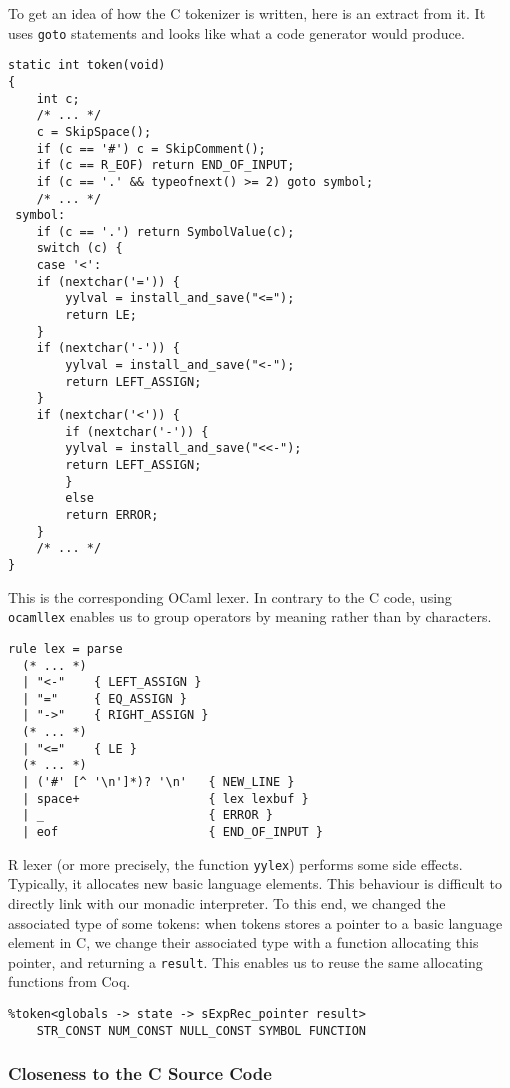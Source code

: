 \documentclass{article}
\newcommand\Coq{Coq}
\newcommand\OCaml{OCaml}
\newcommand\R{R}
\newcommand\Cn{C}
\begin{document}
To get an idea of how the \Cn{} tokenizer is written, here is an extract from it.
It uses \texttt{goto} statements and looks like
what a code generator would produce.
\begin{verbatim}
static int token(void)
{
    int c;
    /* ... */
    c = SkipSpace();
    if (c == '#') c = SkipComment();
    if (c == R_EOF) return END_OF_INPUT;
    if (c == '.' && typeofnext() >= 2) goto symbol;
    /* ... */
 symbol:
    if (c == '.') return SymbolValue(c);
    switch (c) {
    case '<':
    if (nextchar('=')) {
        yylval = install_and_save("<=");
        return LE;
    }
    if (nextchar('-')) {
        yylval = install_and_save("<-");
        return LEFT_ASSIGN;
    }
    if (nextchar('<')) {
        if (nextchar('-')) {
        yylval = install_and_save("<<-");
        return LEFT_ASSIGN;
        }
        else
        return ERROR;
    }
    /* ... */
}
\end{verbatim}
This is the corresponding \OCaml{} lexer.
In contrary to the \Cn{} code,
using \texttt{ocamllex} enables us to group operators
by meaning rather than by characters.
\begin{verbatim}
rule lex = parse
  (* ... *)
  | "<-"    { LEFT_ASSIGN }
  | "="     { EQ_ASSIGN }
  | "->"    { RIGHT_ASSIGN }
  (* ... *)
  | "<="    { LE }
  (* ... *)
  | ('#' [^ '\n']*)? '\n'   { NEW_LINE }
  | space+                  { lex lexbuf }
  | _                       { ERROR }
  | eof                     { END_OF_INPUT }
\end{verbatim}

\R{} lexer (or more precisely, the function \texttt{yylex})
performs some side effects.
Typically, it allocates new basic language elements.
This behaviour is difficult to directly link with our monadic interpreter.
To this end, we changed the associated type of some tokens:
when tokens stores a pointer to a basic language element in \Cn{},
we change their associated type with a function allocating this pointer,
and returning a \texttt{result}.
This enables us to reuse the same allocating functions from \Coq{}.
\begin{verbatim}
%token<globals -> state -> sExpRec_pointer result>
    STR_CONST NUM_CONST NULL_CONST SYMBOL FUNCTION
\end{verbatim}


\subsubsection{Closeness to the \Cn{} Source Code}
\label{sec:closeness}
\end{document}
